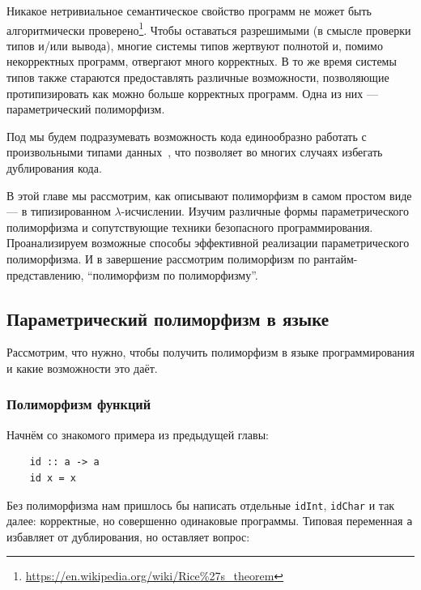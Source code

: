

Никакое нетривиальное семантическое свойство программ не может быть алгоритмически проверено\footnote{\url{https://en.wikipedia.org/wiki/Rice\%27s_theorem}}.
Чтобы оставаться разрешимыми (в смысле проверки типов и/или вывода), многие системы типов жертвуют полнотой и, помимо некорректных программ, отвергают много корректных.
В то же время системы типов также стараются предоставлять различные возможности, позволяющие протипизировать как можно больше корректных программ.
Одна из них --- параметрический полиморфизм.

Под  мы будем подразумевать возможность кода единообразно работать с произвольными типами данных~\cite{strachey2000fundamental, cardelli1985understanding}, что позволяет во многих случаях избегать дублирования кода.

В этой главе мы рассмотрим, как описывают полиморфизм в самом простом виде --- в типизированном $\lambda$-исчислении.
Изучим различные формы параметрического полиморфизма и сопутствующие техники безопасного программирования.
Проанализируем возможные способы эффективной реализации параметрического полиморфизма.
И в завершение рассмотрим полиморфизм по рантайм-представлению, ``полиморфизм по полиморфизму''.

\subsection{Параметрический полиморфизм в языке} \label{subsec:lang-parametric-polumorphism}

Рассмотрим, что нужно, чтобы получить полиморфизм в языке программирования и какие возможности это даёт.

\subsubsection{Полиморфизм функций}

Начнём со знакомого примера из предыдущей главы:
\begin{verbatim}
    id :: a -> a
    id x = x
\end{verbatim}
Без полиморфизма нам пришлось бы написать отдельные \texttt{idInt}, \texttt{idChar} и так далее: корректные, но совершенно одинаковые программы.
Типовая переменная \texttt{a} избавляет от дублирования, но оставляет вопрос: 

